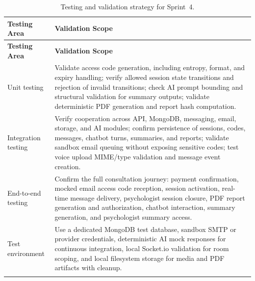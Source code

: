 \documentclass[a4paper,12pt]{report}
\begin{document}
\begin{longtable}{@{} L{0.22\textwidth} L{0.68\textwidth} @{}}
\toprule
\textbf{Testing Area} &
\textbf{Validation Scope} \\
\midrule
\endfirsthead

\toprule
\textbf{Testing Area} &
\textbf{Validation Scope} \\
\midrule
\endhead

Unit testing & Validate access code generation, including entropy, format, and expiry handling; verify allowed session state transitions and rejection of invalid transitions; check AI prompt bounding and structural validation for summary outputs; validate deterministic PDF generation and report hash computation. \\
\midrule
Integration testing & Verify cooperation across API, MongoDB, messaging, email, storage, and AI modules; confirm persistence of sessions, codes, messages, chatbot turns, summaries, and reports; validate sandbox email queuing without exposing sensitive codes; test voice upload MIME/type validation and message event creation. \\
\midrule
End-to-end testing & Confirm the full consultation journey: payment confirmation, mocked email access code reception, session activation, real-time message delivery, psychologist session closure, PDF report generation and authorization, chatbot interaction, summary generation, and psychologist summary access. \\
\midrule
Test environment & Use a dedicated MongoDB test database, sandbox SMTP or provider credentials, deterministic AI mock responses for continuous integration, local Socket.io validation for room scoping, and local filesystem storage for media and PDF artifacts with cleanup. \\
\bottomrule
\caption{Testing and validation strategy for Sprint~4.}
\label{tab:sprint4-testing-strategy}\\
\end{longtable}
\end{document}
